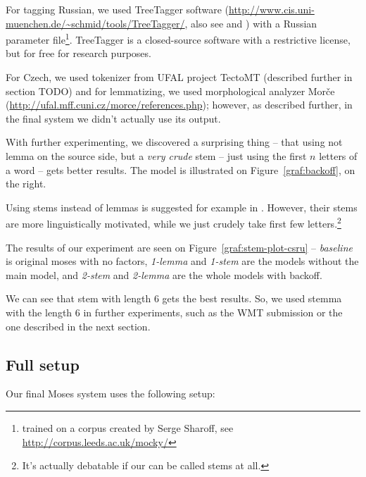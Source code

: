 For tagging Russian, we used TreeTagger software (\url{http://www.cis.uni-muenchen.de/~schmid/tools/TreeTagger/}, also see \cite{treetagger1} and \cite{treetagger2}) with a Russian parameter file\footnote{trained on a corpus created by Serge Sharoff, see \url{http://corpus.leeds.ac.uk/mocky/}}. TreeTagger is a closed-source software with a restrictive license, but for free for research purposes.

For Czech, we used tokenizer from UFAL project TectoMT (described further in section TODO) and for lemmatizing, we used morphological analyzer Morče (\url{http://ufal.mff.cuni.cz/morce/references.php}); however, as described further, in the final system we didn't actually use its output.

With further experimenting, we discovered a surprising thing -- that using not lemma on the source side, but a \emph{very crude} stem -- just using the first $n$ letters of a word -- gets better results.
The model is illustrated on Figure~\ref{graf:backoff}, on the right.

Using stems instead of lemmas is suggested for example in \cite{stemy}. However, their stems are more linguistically motivated, while we just crudely take first few letters.\footnote{It's actually debatable if our  can be called stems at all.}


The results of our experiment are seen on Figure~\ref{graf:stem-plot-csru} -- \emph{baseline} is original moses with no factors, \emph{1-lemma} and \emph{1-stem} are the  models without the main model, and \emph{2-stem} and \emph{2-lemma} are the whole models with backoff.
 
We can see that stem with length 6 gets the best results. So, we used stemma with the length 6 in further experiments, such as the WMT submission \cite{mujpaper} or the one described in the next section.

\subsection{Full setup}
Our final Moses system uses the following setup:


